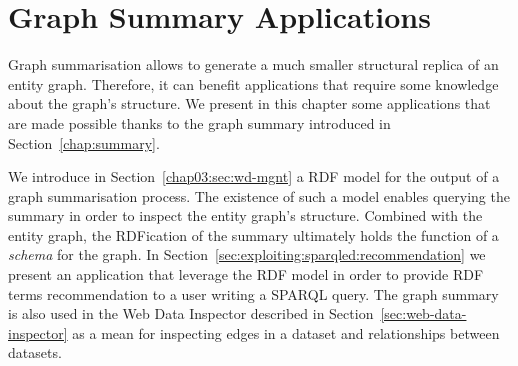 \chapter{Graph Summary Applications}
\label{chap:system}

Graph summarisation allows to generate a much smaller structural replica of an entity graph. Therefore, it can benefit applications that require some knowledge about the graph's structure. We present in this chapter some applications that are made possible thanks to the graph summary introduced in Section~\ref{chap:summary}.

We introduce in Section~\ref{chap03:sec:wd-mgnt} a RDF model for the output of a graph summarisation process. The existence of such a model enables querying the summary in order to inspect the entity graph's structure. Combined with the entity graph, the RDFication of the summary ultimately holds the function of a \emph{schema} for the graph. In Section~\ref{sec:exploiting:sparqled:recommendation} we present an application that leverage the RDF model in order to provide RDF terms recommendation to a user writing a SPARQL query. The graph summary is also used in the Web Data Inspector described in Section~\ref{sec:web-data-inspector} as a mean for inspecting edges in a dataset and relationships between datasets.
